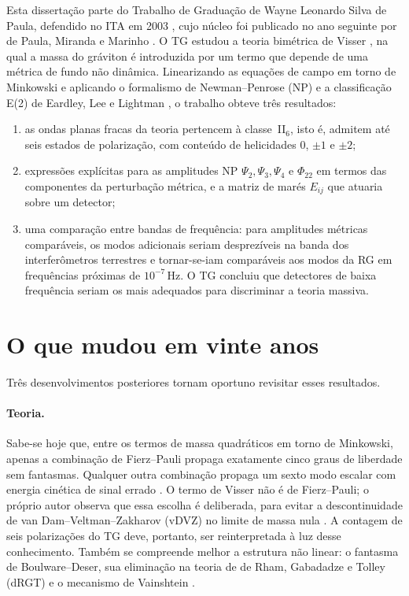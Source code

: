 Esta dissertação parte do Trabalho de Graduação de Wayne Leonardo Silva
de Paula, defendido no ITA em 2003 \autocite{tg2003}, cujo núcleo foi
publicado no ano seguinte por de Paula, Miranda e Marinho
\autocite{depaula2004}. O TG estudou a teoria bimétrica de Visser
\autocite{visser1998}, na qual a massa do gráviton é introduzida por um
termo que depende de uma métrica de fundo não dinâmica. Linearizando as
equações de campo em torno de Minkowski e aplicando o formalismo de
Newman--Penrose (NP) e a classificação E(2) de Eardley, Lee e Lightman
\autocite{eardley1973}, o trabalho obteve três resultados:
\begin{enumerate}
 \item as ondas planas fracas da teoria pertencem à classe~II$_6$, isto é,
 admitem até seis estados de polarização, com conteúdo de helicidades
 $0$, $\pm1$ e $\pm2$;
 \item expressões explícitas para as amplitudes NP
 $\Psi_2,\Psi_3,\Psi_4$ e $\Phi_{22}$ em termos das componentes da
 perturbação métrica, e a matriz de marés $E_{ij}$ que atuaria sobre
 um detector;
 \item uma comparação entre bandas de frequência: para amplitudes métricas
 comparáveis, os modos adicionais seriam desprezíveis na banda dos
 interferômetros terrestres e tornar-se-iam comparáveis aos modos da RG
 em frequências próximas de $10^{-7}\,\mathrm{Hz}$. O TG concluiu que
 detectores de baixa frequência seriam os mais adequados para
 discriminar a teoria massiva.
\end{enumerate}

\section{O que mudou em vinte anos}

Três desenvolvimentos posteriores tornam oportuno revisitar esses
resultados.

\paragraph{Teoria.} Sabe-se hoje que, entre os termos de massa
quadráticos em torno de Minkowski, apenas a combinação de Fierz--Pauli
\autocite{fierz1939} propaga exatamente cinco graus de liberdade sem
fantasmas. Qualquer outra combinação propaga um sexto modo escalar com
energia cinética de sinal errado \autocite{hinterbichler2012,park2010}.
O termo de Visser não é de Fierz--Pauli; o próprio autor observa que
essa escolha é deliberada, para evitar a descontinuidade de van
Dam--Veltman--Zakharov (vDVZ) no limite de massa nula
\autocite{visser1998,vandam1970,zakharov1970}. A contagem de seis
polarizações do TG deve, portanto, ser reinterpretada à luz desse
conhecimento. Também se compreende melhor a estrutura não linear:
o fantasma de Boulware--Deser, sua eliminação na teoria de de Rham,
Gabadadze e Tolley (dRGT) e o mecanismo de Vainshtein
\autocite{boulware1972,derham2011,vainshtein1972,babichev2013}.

